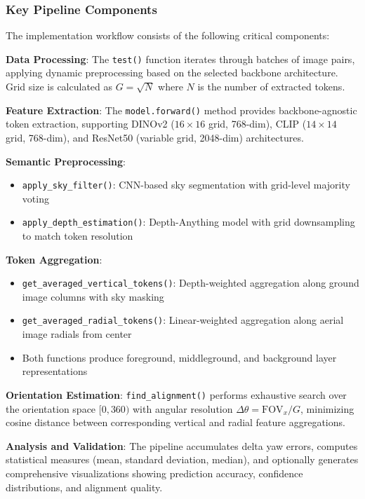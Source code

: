 \subsubsection{Key Pipeline Components}

The implementation workflow consists of the following critical components:

\textbf{Data Processing}: The \texttt{test()} function iterates through batches of image pairs, applying dynamic preprocessing based on the selected backbone architecture. Grid size is calculated as $G = \sqrt{N}$ where $N$ is the number of extracted tokens.

\textbf{Feature Extraction}: The \texttt{model.forward()} method provides backbone-agnostic token extraction, supporting DINOv2 ($16 \times 16$ grid, 768-dim), CLIP ($14 \times 14$ grid, 768-dim), and ResNet50 (variable grid, 2048-dim) architectures.

\textbf{Semantic Preprocessing}: 
\begin{itemize}
    \item \texttt{apply\_sky\_filter()}: CNN-based sky segmentation with grid-level majority voting
    \item \texttt{apply\_depth\_estimation()}: Depth-Anything model with grid downsampling to match token resolution
\end{itemize}

\textbf{Token Aggregation}:
\begin{itemize}
    \item \texttt{get\_averaged\_vertical\_tokens()}: Depth-weighted aggregation along ground image columns with sky masking
    \item \texttt{get\_averaged\_radial\_tokens()}: Linear-weighted aggregation along aerial image radials from center
    \item Both functions produce foreground, middleground, and background layer representations
\end{itemize}

\textbf{Orientation Estimation}: \texttt{find\_alignment()} performs exhaustive search over the orientation space $[0, 360)$ with angular resolution $\Delta\theta = \text{FOV}_x / G$, minimizing cosine distance between corresponding vertical and radial feature aggregations.

\textbf{Analysis and Validation}: The pipeline accumulates delta yaw errors, computes statistical measures (mean, standard deviation, median), and optionally generates comprehensive visualizations showing prediction accuracy, confidence distributions, and alignment quality.
